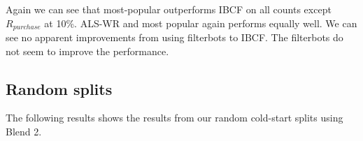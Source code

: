 Again we can see that most-popular outperforms IBCF on all counts except $R_{purchase}$ at 10\%. ALS-WR and most popular again performs equally well.
We can see no apparent improvements from using filterbots to IBCF. The filterbots do not seem to improve the performance.

\subsection{Random splits}

The following results shows the results from our random cold-start splits using Blend 2.

\begin{table}[H]
\centering
{}
\end{table}

